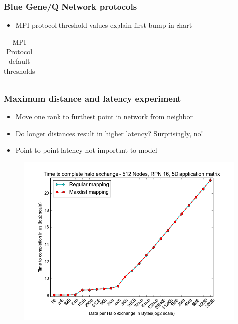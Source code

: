 \documentclass{beamer}
\begin{document}

\begin{frame}[fragile]
\frametitle{Blue Gene/Q Network protocols}
\begin{itemize}
    \item MPI protocol threshold values explain first bump in chart
\end{itemize}
\begin{table}
  \caption{MPI Protocol default thresholds
    \label{table:bgq_protocols}}
  {\footnotesize
    \begin{tabular}{ | l | l | l | p{1.5cm} |}
    \hline 
    
    \end{tabular}
  }
\end{table}
\end{frame}

\begin{frame}
\frametitle{Maximum distance and latency experiment}
\begin{itemize}
    \item Move one rank to furthest point in network from neighbor
    \item Do longer distances result in higher latency? Surprisingly, no!
    \item Point-to-point latency not important to model
\end{itemize}
\vspace{-1em}
\begin{figure}
\includegraphics[width=0.6\linewidth]{../regular_vs_maxdist.png}
\end{figure}
\end{frame}
\end{document}
